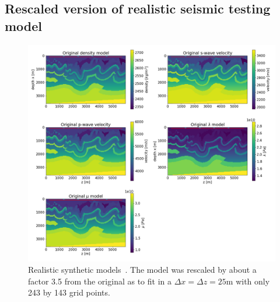 \documentclass[10pt]{SelfArx} %
\theoremstyle{definition}
\begin{document}
\subsection{Rescaled version of realistic seismic testing model}
\begin{figure}[!h]\label{fig:cana_model}
\hspace*{-0.4in}
\includegraphics[width=1.15\textwidth]{fig/cana_models.png}
\caption{Realistic synthetic models~\cite{Gray1995}. The model was rescaled by about a factor 3.5 from the original as to fit in a $\Delta x = \Delta z =25$m with only 243 by 143 grid points.}
\end{figure}
\end{document}
